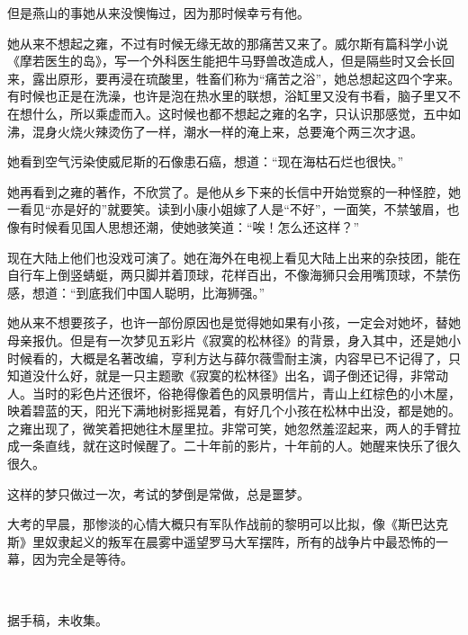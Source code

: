 \par 但是燕山的事她从来没懊悔过，因为那时候幸亏有他。
\par 她从来不想起之雍，不过有时候无缘无故的那痛苦又来了。威尔斯有篇科学小说《摩若医生的岛》，写一个外科医生能把牛马野兽改造成人，但是隔些时又会长回来，露出原形，要再浸在琉酸里，牲畜们称为“痛苦之浴”，她总想起这四个字来。有时候也正是在洗澡，也许是泡在热水里的联想，浴缸里又没有书看，脑子里又不在想什么，所以乘虚而入。这时候也都不想起之雍的名字，只认识那感觉，五中如沸，混身火烧火辣烫伤了一样，潮水一样的淹上来，总要淹个两三次才退。
\par 她看到空气污染使威尼斯的石像患石癌，想道：“现在海枯石烂也很快。”
\par 她再看到之雍的著作，不欣赏了。是他从乡下来的长信中开始觉察的一种怪腔，她一看见“亦是好的”就要笑。读到小康小姐嫁了人是“不好”，一面笑，不禁皱眉，也像有时候看见国人思想还潮，使她骇笑道：“唉！怎么还这样？”
\par 现在大陆上他们也没戏可演了。她在海外在电视上看见大陆上出来的杂技团，能在自行车上倒竖蜻蜓，两只脚并着顶球，花样百出，不像海狮只会用嘴顶球，不禁伤感，想道：“到底我们中国人聪明，比海狮强。”
\par 她从来不想要孩子，也许一部份原因也是觉得她如果有小孩，一定会对她坏，替她母亲报仇。但是有一次梦见五彩片《寂寞的松林径》的背景，身入其中，还是她小时候看的，大概是名著改编，亨利方达与薛尔薇雪耐主演，内容早已不记得了，只知道没什么好，就是一只主题歌《寂寞的松林径》出名，调子倒还记得，非常动人。当时的彩色片还很坏，俗艳得像着色的风景明信片，青山上红棕色的小木屋，映着碧蓝的天，阳光下满地树影摇晃着，有好几个小孩在松林中出没，都是她的。之雍出现了，微笑着把她往木屋里拉。非常可笑，她忽然羞涩起来，两人的手臂拉成一条直线，就在这时候醒了。二十年前的影片，十年前的人。她醒来快乐了很久很久。
\par 这样的梦只做过一次，考试的梦倒是常做，总是噩梦。
\par 大考的早晨，那惨淡的心情大概只有军队作战前的黎明可以比拟，像《斯巴达克斯》里奴隶起义的叛军在晨雾中遥望罗马大军摆阵，所有的战争片中最恐怖的一幕，因为完全是等待。
\par {}
\par  
\par *据手稿，未收集。






